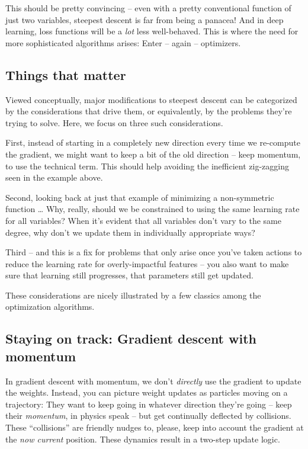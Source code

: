 \documentclass[
  letterpaper,
]{krantz}
\begin{document}
This should be pretty convincing -- even with a pretty conventional
function of just two variables, steepest descent is far from being a
panacea! And in deep learning, loss functions will be a \emph{lot} less
well-behaved. This is where the need for more sophisticated algorithms
arises: Enter -- again -- optimizers.

\hypertarget{things-that-matter}{%
\subsection{Things that matter}\label{things-that-matter}}

Viewed conceptually, major modifications to steepest descent can be
categorized by the considerations that drive them, or equivalently, by
the problems they're trying to solve. Here, we focus on three such
considerations.

First, instead of starting in a completely new direction every time we
re-compute the gradient, we might want to keep a bit of the old
direction -- keep momentum, to use the technical term. This should help
avoiding the inefficient zig-zagging seen in the example above.

Second, looking back at just that example of minimizing a non-symmetric
function \ldots{} Why, really, should we be constrained to using the
same learning rate for all variables? When it's evident that all
variables don't vary to the same degree, why don't we update them in
individually appropriate ways?

Third -- and this is a fix for problems that only arise once you've
taken actions to reduce the learning rate for overly-impactful features
-- you also want to make sure that learning still progresses, that
parameters still get updated.

These considerations are nicely illustrated by a few classics among the
optimization algorithms.

\hypertarget{staying-on-track-gradient-descent-with-momentum}{%
\subsection{\texorpdfstring{Staying on track: Gradient descent with
momentum}{Staying on track: Gradient descent with momentum}}\label{staying-on-track-gradient-descent-with-momentum}}

In gradient descent with momentum, we don't \emph{directly} use the
gradient to update the weights. Instead, you can picture weight updates
as particles moving on a trajectory: They want to keep going in whatever
direction they're going -- keep their \emph{momentum}, in physics speak
-- but get continually deflected by collisions. These ``collisions'' are
friendly nudges to, please, keep into account the gradient at the
\emph{now current} position. These dynamics result in a two-step update
logic.
\end{document}
